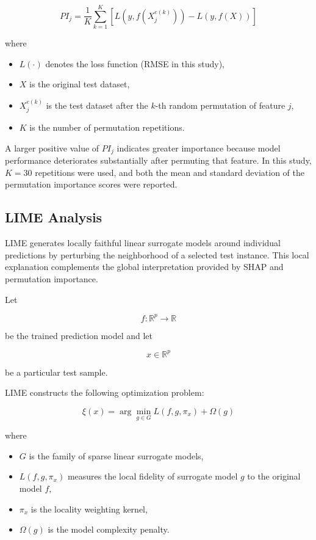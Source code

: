 \begin{equation}
PI_j
=
\frac{1}{K}
\sum_{k=1}^{K}
\left[
L\!\left(
y,
f(X_j^{e(k)})
\right)
-
L\!\left(
y,
f(X)
\right)
\right]
\label{eq:pi}
\end{equation}

where

\begin{itemize}
\item $L(\cdot)$ denotes the loss function (RMSE in this study),
\item $X$ is the original test dataset,
\item $X_j^{e(k)}$ is the test dataset after the $k$-th random permutation of feature $j$,
\item $K$ is the number of permutation repetitions.
\end{itemize}

A larger positive value of $PI_j$ indicates greater importance because model performance deteriorates substantially after permuting that feature. In this study, $K=30$ repetitions were used, and both the mean and standard deviation of the permutation importance scores were reported.



\subsection{LIME Analysis}

LIME generates locally faithful linear surrogate models around individual predictions by perturbing the neighborhood of a selected test instance. This local explanation complements the global interpretation provided by SHAP and permutation importance.

Let

\[
f:\mathbb{R}^{p}\rightarrow\mathbb{R}
\]

be the trained prediction model and let

\[
x\in\mathbb{R}^{p}
\]

be a particular test sample.

LIME constructs the following optimization problem:

\begin{equation}
\xi(x)
=
\arg\min_{g\in G}
L(f,g,\pi_x)
+
\Omega(g)
\label{eq:lime}
\end{equation}

where

\begin{itemize}
\item $G$ is the family of sparse linear surrogate models,
\item $L(f,g,\pi_x)$ measures the local fidelity of surrogate model $g$ to the original model $f$,
\item $\pi_x$ is the locality weighting kernel,
\item $\Omega(g)$ is the model complexity penalty.
\end{itemize}

